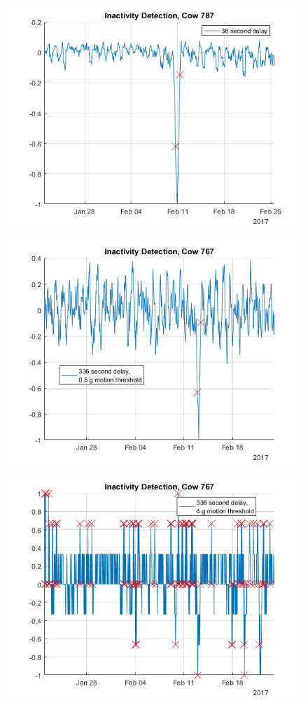 \begin{figure}[htb]
\centering
\includegraphics[width = 0.75 \textwidth]{figures/InactivityDetectionCow787_36period.png}
\caption{}
\label{InactivityDetectionCow787_36period}
\end{figure}

\begin{figure}[htb]
\centering
\includegraphics[width = 0.75 \textwidth]{figures/InactivityDetectionCow767_336period05threshold.png}
\caption{}
\label{InactivityDetectionCow767_336period05threshold}
\end{figure}

\begin{figure}[htb]
\centering
\includegraphics[width = 0.75 \textwidth]{figures/InactivityDetectionCow767_336period4threshold.png}
\caption{}
\label{InactivityDetectionCow767_336period4threshold}
\end{figure}


